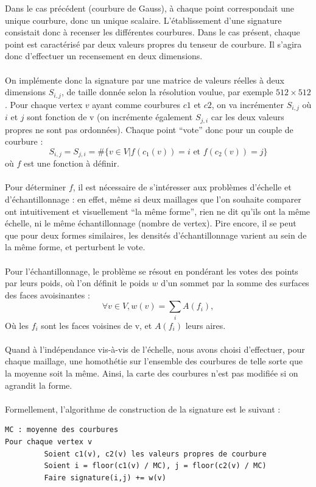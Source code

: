 \documentclass{llncs}
\begin{document}
Dans le cas précédent (courbure de Gauss), à chaque point correspondait une unique courbure, donc un unique scalaire. L’établissement d’une signature consistait donc à recenser les différentes courbures. Dans le cas présent, chaque point est caractérisé par deux valeurs propres du tenseur de courbure. Il s’agira donc d’effectuer un recensement en deux dimensions.
\\\\
On implémente donc la signature par une matrice de valeurs réelles à deux dimensions $S_{i,j}$, de taille donnée selon la résolution voulue, par exemple $ 512 \times 512 $. Pour chaque vertex $ v $ ayant comme courbures $ c1$ et $c2 $, on va incrémenter $ S_{i,j} $ où $i$ et $j$ sont fonction de v (on incrémente également $ S_{j,i} $ car les deux valeurs propres ne sont pas ordonnées). Chaque point ``vote'' donc pour un couple de courbure :
$$
S_{i,j} = S_{j,i} = \# \{v\in V|f(c_1(v))=i \mbox{ et } f(c_2(v))=j \}
$$
où $f$ est une fonction à définir.
\\\\
Pour déterminer $f$, il est nécessaire de s’intéresser aux problèmes d’échelle et d’échantillonnage : en effet, même si deux maillages que l’on souhaite comparer ont intuitivement et visuellement ``la même forme'', rien ne dit qu’ils ont la même échelle, ni le même échantillonnage (nombre de vertex). Pire encore, il se peut que pour deux formes similaires, les densités d’échantillonnage varient au sein de la même forme, et perturbent le vote.
\\\\
Pour l’échantillonnage, le problème se résout en pondérant les votes des points par leurs poids, où l’on définit le poids $w$ d’un sommet par la somme des surfaces des faces avoisinantes :
$$
\forall v\in V, w(v) = \sum_{i}{A(f_i)},
$$
Où les $f_i$ sont les faces voisines de v, et $A(f_i)$ leurs aires.
\\\\
Quand à l'indépendance vis-à-vis de l'échelle, nous avons choisi d’effectuer, pour chaque maillage, une homothétie sur l’ensemble des courbures de telle sorte que la moyenne soit la même. Ainsi, la carte des courbures n’est pas modifiée si on agrandit la forme.
\\\\
Formellement, l’algorithme de construction de la signature est le suivant :

\begin{verbatim}
MC : moyenne des courbures
Pour chaque vertex v
         Soient c1(v), c2(v) les valeurs propres de courbure
         Soient i = floor(c1(v) / MC), j = floor(c2(v) / MC)
         Faire signature(i,j) += w(v)
\end{verbatim}
\end{document}
